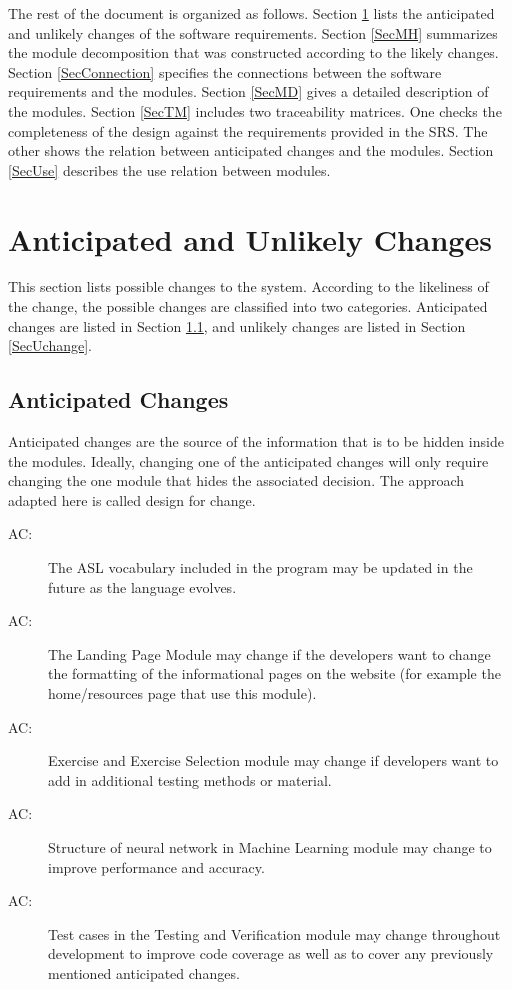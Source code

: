 \documentclass[12pt, titlepage]{article}
\newcounter{acnum}
\newcommand{\actheacnum}{AC\theacnum}
\begin{document}
The rest of the document is organized as follows. Section
\ref{SecChange} lists the anticipated and unlikely changes of the software
requirements. Section \ref{SecMH} summarizes the module decomposition that
was constructed according to the likely changes. Section \ref{SecConnection}
specifies the connections between the software requirements and the
modules. Section \ref{SecMD} gives a detailed description of the
modules. Section \ref{SecTM} includes two traceability matrices. One checks
the completeness of the design against the requirements provided in the SRS. The
other shows the relation between anticipated changes and the modules. Section
\ref{SecUse} describes the use relation between modules.

\section{Anticipated and Unlikely Changes} \label{SecChange}

This section lists possible changes to the system. According to the likeliness
of the change, the possible changes are classified into two
categories. Anticipated changes are listed in Section \ref{SecAchange}, and
unlikely changes are listed in Section \ref{SecUchange}.

\subsection{Anticipated Changes} \label{SecAchange}

Anticipated changes are the source of the information that is to be hidden
inside the modules. Ideally, changing one of the anticipated changes will only
require changing the one module that hides the associated decision. The approach
adapted here is called design for
change.

\begin{description}
\item[ \actheacnum \label{acInfo}:] The ASL vocabulary included in the program may be updated in the future as the language evolves.
\item[ \actheacnum \label{acAbout}:] The Landing Page Module may change if the developers want to change the formatting of the informational pages on the website (for example the home/resources page that use this module). 
\item[ \actheacnum \label{acExercise}:] Exercise and Exercise Selection module may change if developers want to add in additional testing methods or material.
\item[ \actheacnum \label{acMLModel}:] Structure of neural network in Machine Learning module may change to improve performance and accuracy.
\item[ \actheacnum \label{acTestVerif}:] Test cases in the Testing and Verification module may change throughout development to improve code coverage as well as to cover any previously mentioned anticipated changes.
\end{description}
\end{document}
